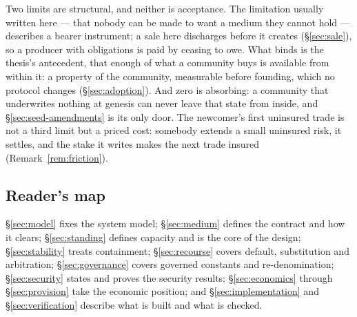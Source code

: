 Two limits are structural, and neither is acceptance. The limitation usually written here
--- that nobody can be made to want a medium they cannot hold --- describes a bearer
instrument; a sale here discharges before it creates (\S\ref{sec:sale}), so a producer
with obligations is paid by ceasing to owe. What binds is the thesis's antecedent, that
enough of what a community buys is available from within it: a property of the community,
measurable before founding, which no protocol changes (\S\ref{sec:adoption}). And zero is
absorbing: a community that underwrites nothing at genesis can never leave that state from
inside, and \S\ref{sec:seed-amendments} is its only door. The newcomer's first uninsured
trade is not a third limit but a priced cost: somebody extends a small uninsured risk, it
settles, and the stake it writes makes the next trade insured (Remark~\ref{rem:friction}).

\subsection{Reader's map}

\S\ref{sec:model} fixes the system model; \S\ref{sec:medium} defines the contract and
how it clears; \S\ref{sec:standing} defines capacity and is the core of the design;
\S\ref{sec:stability} treats containment; \S\ref{sec:recourse} covers default,
substitution and arbitration; \S\ref{sec:governance} covers governed constants and
re-denomination; \S\ref{sec:security} states and proves the security results;
\S\ref{sec:economics} through \S\ref{sec:provision} take the economic position; and
\S\ref{sec:implementation} and \S\ref{sec:verification} describe what is built and what
is checked.
